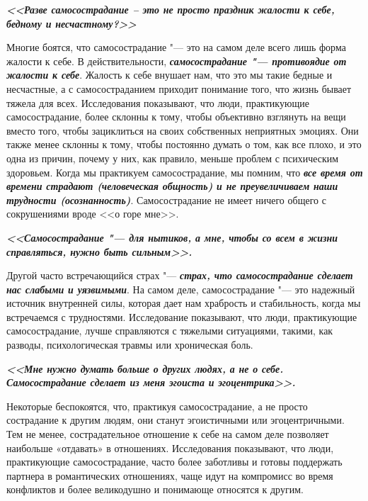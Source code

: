 \vspace{4ex}

\textbf{\textit{<<Разве самосострадание – это не просто праздник жалости к себе, бедному и несчастному?>>}}

\vspace{2ex}

Многие боятся, что самосострадание "--- это на самом деле всего лишь форма жалости к себе. В действительности,\textbf{\textit{ самосострадание "--- противоядие от жалости к себе}}. Жалость к себе внушает нам, что это мы такие бедные и несчастные, а с самосостраданием приходит понимание того, что жизнь бывает тяжела для всех. Исследования показывают, что люди, практикующие самосострадание, более склонны к тому, чтобы объективно взглянуть на вещи вместо того, чтобы зациклиться на своих собственных неприятных эмоциях. Они также менее склонны к тому, чтобы постоянно думать о том, как все плохо, и это одна из причин, почему у них, как правило, меньше проблем с психическим здоровьем. Когда мы практикуем самосострадание, мы помним, что \textbf{\textit{все время от времени страдают (человеческая общность) и не преувеличиваем наши трудности (осознанность)}}. Самосострадание не имеет ничего общего с сокрушениями вроде <<о горе мне>>. 

\vspace{4ex}

\textbf{\textit{<<Самосострадание "--- для нытиков, а мне, чтобы со всем в жизни справляться, нужно быть сильным>>.}}

\vspace{2ex}

Другой часто встречающийся страх "--- \textbf{\textit{страх, что самосострадание сделает нас слабыми и уязвимыми}}. На самом деле, самосострадание "--- это надежный источник внутренней силы, которая дает нам храбрость и стабильность, когда мы встречаемся с трудностями. Исследование показывают, что люди, практикующие самосострадание, лучше справляются с тяжелыми ситуациями, такими, как разводы, психологическая травмы или хроническая боль.

\vspace{4ex}

\textbf{\textit{<<Мне нужно думать больше о других людях, а не о себе. Самосострадание сделает из меня эгоиста и эгоцентрика>>.}}

\vspace{2ex}

Некоторые беспокоятся, что, практикуя самосострадание, а не просто сострадание к другим людям, они станут эгоистичными или эгоцентричными. Тем не менее, сострадательное отношение к себе на самом деле позволяет наибольше «отдавать» в отношениях. Исследования показывают, что люди, практикующие самосострадание, часто более заботливы и готовы поддержать партнера в романтических отношениях, чаще идут на компромисс во время конфликтов и более великодушно и понимающе относятся к другим. 

